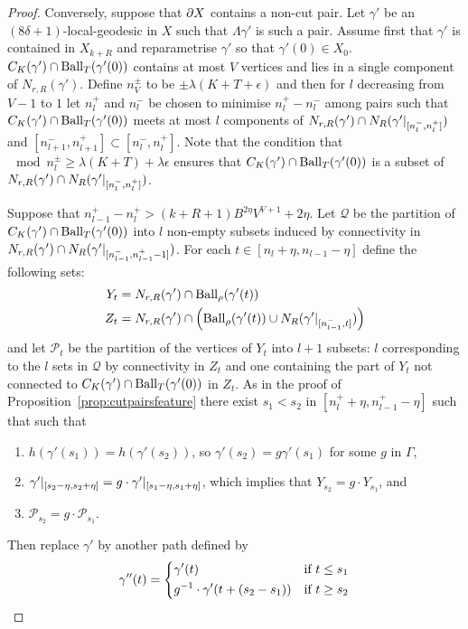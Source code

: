 \begin{proof}
Conversely, suppose that $\partial X$ contains a non-cut pair. Let $\gamma'$
be an $(8\delta+1)$-local-geodesic in $X$ such that $\Lambda\gamma'$ is such a
pair. Assume first that $\gamma'$ is contained in $X_{k+R}$ and reparametrise
$\gamma'$ so that $\gamma'(0) \in X_0$. $C_K(\gamma') \cap
\operatorname{\mathrm{Ball}}_T(\gamma'(0))$ contains at most $V$ vertices and lies in a single component
of $N_{r, R}(\gamma')$. Define $n_V^\pm$ to be $\pm\lambda(K+T+\epsilon)$ and
then for $l$ decreasing from $V-1$ to $1$ let $n_l^+$ and $n_l^-$ be chosen to
minimise $n_l^+ - n_l^-$ among pairs such that $C_K(\gamma') \cap
\operatorname{\mathrm{Ball}}_T(\gamma'(0))$ meets at most $l$ components of $N_{r, R}(\gamma')
\cap N_R(\gamma'\vert_{[n_l^-, n_l^+]})$ and $[n_{l+1}^-,
n_{l+1}^+] \subset [n_l^-, n_l^+]$.  Note that the condition that
$\mod{n^\pm_l} \geq \lambda(K + T) + \lambda\epsilon$ ensures that $C_K(\gamma')
\cap \operatorname{\mathrm{Ball}}_T(\gamma'(0))$ is a subset of $N_{r, R}(\gamma') \cap
N_R(\gamma'\vert_{[n_l^-, n_l^+]})$.

Suppose that $n_{l - 1}^+ - n_l^+ > (k + R + 1)B^{2\eta} V^{V+1} + 2\eta$. Let
$\mathcal{Q}$ be the partition of $C_K(\gamma') \cap \operatorname{\mathrm{Ball}}_T(\gamma'(0))$
into $l$ non-empty subsets induced by connectivity in $N_{r,
R}(\gamma') \cap N_R(\gamma'\vert_{[n_{l-1}^-, n_{l-1}^+-1]})$.
For each $t \in [n_l + \eta, n_{l-1} - \eta]$ define the following sets:
\begin{align*}
Y_t &= N_{r, R}(\gamma') \cap \operatorname{\mathrm{Ball}}_\rho(\gamma'(t)) \\
Z_t &= N_{r, R}(\gamma') \cap \left(\operatorname{\mathrm{Ball}}_\rho(\gamma'(t)) \cup
  N_R(\gamma'\vert_{[n_{l-1}^-, t]})\right)
\end{align*}
and let $\mathcal{P}_t$ be the partition of the vertices of $Y_t$ into $l + 1$
subsets: $l$ corresponding to the $l$ sets in $\mathcal{Q}$ by connectivity in
$Z_t$ and one containing the part of $Y_t$ not connected to $C_K(\gamma')
\cap \operatorname{\mathrm{Ball}}_T(\gamma'(0))$ in $Z_t$.  As in the proof of
Proposition~\ref{prop:cutpairsfeature} there exist $s_1 < s_2$ in $[n^+_l + \eta,
n^+_{l-1} - \eta]$ such that such that
\begin{enumerate}
\item $h(\gamma'(s_1)) = h(\gamma'(s_2))$, so $\gamma'(s_2) = g\gamma'(s_1)$
  for some $g$ in $\Gamma$,
\item $\gamma'\vert_{[s_2-\eta,s_2+\eta]} = g\cdot\gamma'
  \vert_{[s_1-\eta,s_1+\eta]}$, which implies that $Y_{s_2} = g\cdot
  Y_{s_1}$, and
\item 
  $\mathcal{P}_{s_2} = g\cdot\mathcal{P}_{s_1}$. 
\end{enumerate}
Then replace $\gamma'$ by another path defined by
\begin{align*} \gamma''(t) = 
  \begin{dcases}
    \gamma'(t) & \text{if $t \leq s_1$}\\
    g^{-1}\cdot \gamma'(t + (s_2 - s_1)) & \text{if $t \geq s_2$} \\
  \end{dcases}
\end{align*}


\end{proof}
